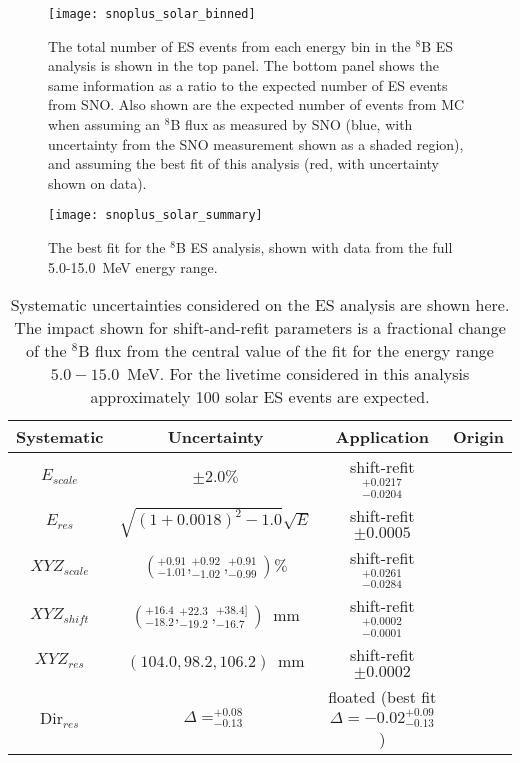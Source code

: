 \begin{figure}
\centering
\texttt{[image: snoplus\_solar\_binned]}
\caption{The total number of ES events from each energy bin in the {\snop} $^8$B ES analysis is shown in the top panel. 
The bottom panel shows the same information as a ratio to the expected number of ES events from SNO. 
Also shown are the expected number of events from MC when assuming an $^8$B flux as measured by SNO (blue, with uncertainty from the SNO measurement shown as a shaded region), and assuming the best fit of this analysis (red, with uncertainty shown on data).}
\label{fig:solar:binned}
\end{figure}

\begin{figure}
\centering
\texttt{[image: snoplus\_solar\_summary]}
\caption{The best fit for the {\snop} $^8$B ES analysis, shown with data from the full 5.0-15.0~MeV energy range.}
\label{fig:solar:summary}
\end{figure}

\begin{table}
\begin{center}
\begin{tabular}{c|c|c|c}
Systematic & Uncertainty & Application & Origin \\ \hline
$E_{scale}$     & $\pm 2.0\%$ & shift-refit $^{+0.0217}_{-0.0204}$ & \N \rule{0pt}{2.6ex}\rule[-1.2ex]{0pt}{0pt}  \\
$E_{res}$       & $\sqrt{(1+0.0018)^2-1.0}\sqrt{E}$ & shift-refit $\pm 0.0005$ & \N  \rule{0pt}{2.6ex}\rule[-1.2ex]{0pt}{0pt}  \\
${XYZ}_{scale}$ & $(^{+0.91}_{-1.01},^{+0.92}_{-1.02},^{+0.91}_{-0.99}) \%$ & shift-refit $^{+0.0261}_{-0.0284}$ & \N  \rule{0pt}{2.6ex}\rule[-1.2ex]{0pt}{0pt}  \\
${XYZ}_{shift}$ & $(^{+16.4}_{-18.2},^{+22.3}_{-19.2},^{+38.4]}_{-16.7})$~mm & shift-refit $^{+0.0002}_{-0.0001}$ & \N  \rule{0pt}{2.6ex}\rule[-1.2ex]{0pt}{0pt}  \\
${XYZ}_{res}$ & $(104.0,98.2,106.2)$~mm & shift-refit $\pm 0.0002$ & \N \rule{0pt}{2.6ex}\rule[-1.2ex]{0pt}{0pt}  \\
Dir$_{res}$     &  $\Delta = ^{+0.08}_{-0.13}$ & floated (best fit $\Delta = -0.02^{+0.09}_{-0.13}$) & \N \rule{0pt}{2.6ex}\rule[-1.2ex]{0pt}{0pt}  \\ \hline
\end{tabular}
\caption{ Systematic uncertainties considered on the {\snop} ES analysis are shown here.
The impact shown for shift-and-refit parameters is a fractional change of the $^8$B flux from the central value of the fit for the energy range $5.0-15.0$~MeV.
For the livetime considered in this analysis approximately 100 solar ES events are expected.}
\label{tbl:solar:systs}
\end{center}
\end{table}

